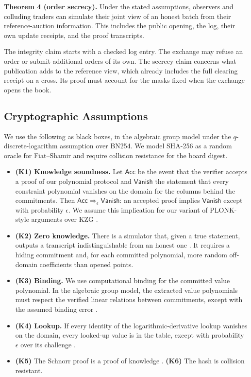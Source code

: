 \textbf{Theorem 4 (order secrecy).} Under the stated assumptions, observers and colluding traders can simulate their joint view of an honest batch from their reference-auction information. This includes the public opening, the log, their own update receipts, and the proof transcripts.

The integrity claim starts with a checked log entry. The exchange may refuse an order or submit additional orders of its own. The secrecy claim concerns what publication adds to the reference view, which already includes the full clearing receipt on a cross. Its proof must account for the masks fixed when the exchange opens the book.

\subsection{Cryptographic Assumptions}
\label{app:zq-security-assumptions}

We use the following as black boxes, in the algebraic group model under the \(q\)-discrete-logarithm assumption over BN254. We model SHA-256 as a random oracle for Fiat--Shamir and require collision resistance for the board digest.

\begin{itemize}
\item
  \textbf{(K1) Knowledge soundness.} Let \(\mathsf{Acc}\) be the event that the verifier accepts a proof of our polynomial protocol and \(\mathsf{Vanish}\) the statement that every constraint polynomial vanishes on the domain for the columns behind the commitments. Then \(\mathsf{Acc} \Rightarrow_\epsilon \mathsf{Vanish}\): an accepted proof implies \(\mathsf{Vanish}\) except with probability \(\epsilon\). We assume this implication for our variant of PLONK-style arguments over KZG \cite{CHM+20,GWC19}.
\item
  \textbf{(K2) Zero knowledge.} There is a simulator that, given a true statement, outputs a transcript indistinguishable from an honest one \cite{Lip25,Sef24}. It requires a hiding commitment and, for each committed polynomial, more random off-domain coefficients than opened points.
\item
  \textbf{(K3) Binding.} We use computational binding for the committed value polynomial. In the algebraic group model, the extracted value polynomials must respect the verified linear relations between commitments, except with the assumed binding error \cite{KZG10}.
\item
  \textbf{(K4) Lookup.} If every identity of the logarithmic-derivative lookup vanishes on the domain, every looked-up value is in the table, except with probability \(\epsilon\) over its challenge \cite{habock2022}.
\item
  \textbf{(K5)} The Schnorr proof is a proof of knowledge \cite{Sch91}. \textbf{(K6)} The hash is collision resistant.
\end{itemize}

